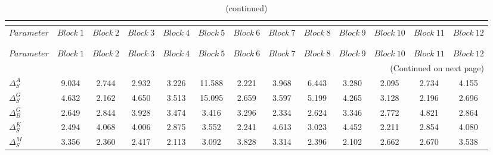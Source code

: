 
\begin{center}
\begin{longtable}{lcccccccccccc} 
\caption{MCMC Inefficiency factors per block}\\
 \label{Table:MCMC_inefficiency_factors}\\
\toprule 
$Parameter             $	 & 	 $     Block~1$	 & 	 $     Block~2$	 & 	 $     Block~3$	 & 	 $     Block~4$	 & 	 $     Block~5$	 & 	 $     Block~6$	 & 	 $     Block~7$	 & 	 $     Block~8$	 & 	 $     Block~9$	 & 	 $    Block~10$	 & 	 $    Block~11$	 & 	 $    Block~12$\\
\midrule \endfirsthead 
\caption{(continued)}\\
 \toprule \\ 
$Parameter             $	 & 	 $     Block~1$	 & 	 $     Block~2$	 & 	 $     Block~3$	 & 	 $     Block~4$	 & 	 $     Block~5$	 & 	 $     Block~6$	 & 	 $     Block~7$	 & 	 $     Block~8$	 & 	 $     Block~9$	 & 	 $    Block~10$	 & 	 $    Block~11$	 & 	 $    Block~12$\\
\midrule \endhead 
\midrule \multicolumn{13}{r}{(Continued on next page)} \\ \bottomrule \endfoot 
\bottomrule \endlastfoot 
$ {\Delta^{A}_{S}}     $	 & 	       9.034	 & 	       2.744	 & 	       2.932	 & 	       3.226	 & 	      11.588	 & 	       2.221	 & 	       3.968	 & 	       6.443	 & 	       3.280	 & 	       2.095	 & 	       2.734	 & 	       4.155 \\ 
$ {\Delta^{G}_{S}}     $	 & 	       4.632	 & 	       2.162	 & 	       4.650	 & 	       3.513	 & 	      15.095	 & 	       2.659	 & 	       3.597	 & 	       5.199	 & 	       4.265	 & 	       3.128	 & 	       2.196	 & 	       2.696 \\ 
$ {\Delta^{G}_{B}}     $	 & 	       2.649	 & 	       2.844	 & 	       3.928	 & 	       3.474	 & 	       3.416	 & 	       3.296	 & 	       2.334	 & 	       2.624	 & 	       3.346	 & 	       2.772	 & 	       4.821	 & 	       2.864 \\ 
$ {\Delta^{K}_{S}}     $	 & 	       2.494	 & 	       4.068	 & 	       4.006	 & 	       2.875	 & 	       3.552	 & 	       2.241	 & 	       4.613	 & 	       3.023	 & 	       4.452	 & 	       2.211	 & 	       2.854	 & 	       4.080 \\ 
$ {\Delta^{M}_{S}}     $	 & 	       3.356	 & 	       2.360	 & 	       2.417	 & 	       2.113	 & 	       3.092	 & 	       3.828	 & 	       3.314	 & 	       2.396	 & 	       2.102	 & 	       2.662	 & 	       2.670	 & 	       3.538 \\ 

\end{longtable}
\end{center}
